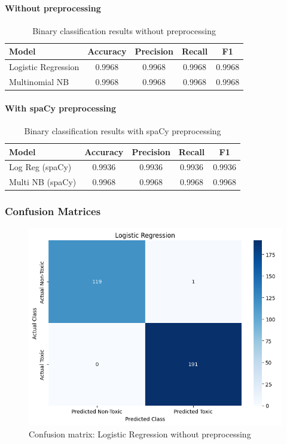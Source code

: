 \documentclass[conference]{IEEEtran}
\begin{document}
\paragraph{Without preprocessing}
\noindent
\begin{table}[H]
  \centering
  \begin{tabular}{lcccc}
    \toprule
    \textbf{Model} & \textbf{Accuracy} & \textbf{Precision} & \textbf{Recall} & \textbf{F1} \\
    \midrule
    Logistic Regression & 0.9968 & 0.9968 & 0.9968 & 0.9968 \\
    Multinomial NB      & 0.9968 & 0.9968 & 0.9968 & 0.9968 \\
    \bottomrule
  \end{tabular}
  \caption{Binary classification results without preprocessing}
\end{table}

\paragraph{With spaCy preprocessing}
\noindent
\begin{table}[H]
  \centering
  \begin{tabular}{lcccc}
    \toprule
    \textbf{Model} & \textbf{Accuracy} & \textbf{Precision} & \textbf{Recall} & \textbf{F1} \\
    \midrule
    Log Reg (spaCy) & 0.9936 & 0.9936 & 0.9936 & 0.9936 \\
    Multi NB (spaCy)      & 0.9968 & 0.9968 & 0.9968 & 0.9968 \\
    \bottomrule
  \end{tabular}
  \caption{Binary classification results with spaCy preprocessing}
\end{table}

\subsubsection{Confusion Matrices}
\noindent

\begin{figure}[H]
  \centering
  \includegraphics[width=0.9\columnwidth]{figures/confusion_lr_no_pre.png}
  \caption{Confusion matrix: Logistic Regression without preprocessing}
\end{figure}
\end{document}
